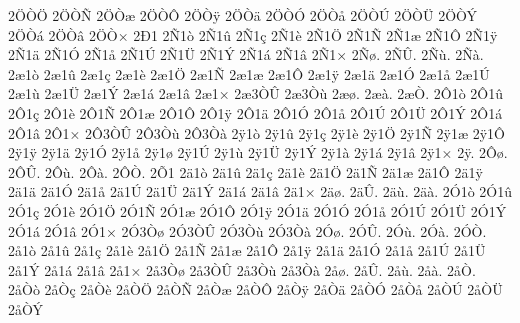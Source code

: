 {2^^d6^^d2^^d6
2^^d6^^d2^^d1
2^^d6^^d2^^e6
2^^d6^^d2^^d4
2^^d6^^d2^^ff
2^^d6^^d2^^e4
2^^d6^^d2^^d3
2^^d6^^d2^^e5
2^^d6^^d2^^da
2^^d6^^d2^^dc
2^^d6^^d2^^dd
2^^d6^^d2^^e1
2^^d6^^d2^^e2
2^^d6^^d2^^d7
2^^d01
2^^d11^^f2
2^^d11^^fb
2^^d11^^e7
2^^d11^^e8
2^^d11^^d6
2^^d11^^d1
2^^d11^^e6
2^^d11^^d4
2^^d11^^ff
2^^d11^^e4
2^^d11^^d3
2^^d11^^e5
2^^d11^^da
2^^d11^^dc
2^^d11^^dd
2^^d11^^e1
2^^d11^^e2
2^^d11^^d7
2^^d1^^f8.
2^^d1^^db.
2^^d1^^f9.
2^^d1^^e0.
2^^e61^^f2
2^^e61^^fb
2^^e61^^e7
2^^e61^^e8
2^^e61^^d6
2^^e61^^d1
2^^e61^^e6
2^^e61^^d4
2^^e61^^ff
2^^e61^^e4
2^^e61^^d3
2^^e61^^e5
2^^e61^^da
2^^e61^^f9
2^^e61^^dc
2^^e61^^dd
2^^e61^^e1
2^^e61^^e2
2^^e61^^d7
2^^e63^^d2^^db
2^^e63^^d2^^f9
2^^e6^^f8.
2^^e6^^e0.
2^^e6^^d2.
2^^d41^^f2
2^^d41^^fb
2^^d41^^e7
2^^d41^^e8
2^^d41^^d1
2^^d41^^e6
2^^d41^^d4
2^^d41^^ff
2^^d41^^e4
2^^d41^^d3
2^^d41^^e5
2^^d41^^da
2^^d41^^dc
2^^d41^^dd
2^^d41^^e1
2^^d41^^e2
2^^d41^^d7
2^^d43^^d2^^db
2^^d43^^d2^^f9
2^^d43^^d2^^e0
2^^ff1^^f2
2^^ff1^^fb
2^^ff1^^e7
2^^ff1^^e8
2^^ff1^^d6
2^^ff1^^d1
2^^ff1^^e6
2^^ff1^^d4
2^^ff1^^ff
2^^ff1^^e4
2^^ff1^^d3
2^^ff1^^e5
2^^ff1^^f8
2^^ff1^^da
2^^ff1^^f9
2^^ff1^^dc
2^^ff1^^dd
2^^ff1^^e0
2^^ff1^^e1
2^^ff1^^e2
2^^ff1^^d7
2^^ff.
2^^d4^^f8.
2^^d4^^db.
2^^d4^^f9.
2^^d4^^e0.
2^^d4^^d2.
2^^d51
2^^e41^^f2
2^^e41^^fb
2^^e41^^e7
2^^e41^^e8
2^^e41^^d6
2^^e41^^d1
2^^e41^^e6
2^^e41^^d4
2^^e41^^ff
2^^e41^^e4
2^^e41^^d3
2^^e41^^e5
2^^e41^^da
2^^e41^^dc
2^^e41^^dd
2^^e41^^e1
2^^e41^^e2
2^^e41^^d7
2^^e4^^f8.
2^^e4^^db.
2^^e4^^f9.
2^^e4^^e0.
2^^d31^^f2
2^^d31^^fb
2^^d31^^e7
2^^d31^^e8
2^^d31^^d6
2^^d31^^d1
2^^d31^^e6
2^^d31^^d4
2^^d31^^ff
2^^d31^^e4
2^^d31^^d3
2^^d31^^e5
2^^d31^^da
2^^d31^^dc
2^^d31^^dd
2^^d31^^e1
2^^d31^^e2
2^^d31^^d7
2^^d33^^d2^^f8
2^^d33^^d2^^db
2^^d33^^d2^^f9
2^^d33^^d2^^e0
2^^d3^^f8.
2^^d3^^db.
2^^d3^^f9.
2^^d3^^e0.
2^^d3^^d2.
2^^e51^^f2
2^^e51^^fb
2^^e51^^e7
2^^e51^^e8
2^^e51^^d6
2^^e51^^d1
2^^e51^^e6
2^^e51^^d4
2^^e51^^ff
2^^e51^^e4
2^^e51^^d3
2^^e51^^e5
2^^e51^^da
2^^e51^^dc
2^^e51^^dd
2^^e51^^e1
2^^e51^^e2
2^^e51^^d7
2^^e53^^d2^^f8
2^^e53^^d2^^db
2^^e53^^d2^^f9
2^^e53^^d2^^e0
2^^e5^^f8.
2^^e5^^db.
2^^e5^^f9.
2^^e5^^e0.
2^^e5^^d2.
2^^e5^^d2^^f2
2^^e5^^d2^^e7
2^^e5^^d2^^e8
2^^e5^^d2^^d6
2^^e5^^d2^^d1
2^^e5^^d2^^e6
2^^e5^^d2^^d4
2^^e5^^d2^^ff
2^^e5^^d2^^e4
2^^e5^^d2^^d3
2^^e5^^d2^^e5
2^^e5^^d2^^da
2^^e5^^d2^^dc
2^^e5^^d2^^dd
}
